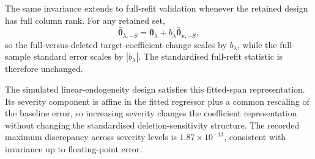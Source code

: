 \documentclass[../main.tex]{subfiles}
\begin{document}
The same invariance extends to full-refit validation whenever the retained design has full column rank. For any retained set,
\[
\widehat{\boldsymbol{\theta}}_{\lambda,-S}
=
\boldsymbol{\theta}_\lambda
+
b_\lambda\widehat{\boldsymbol{\theta}}_{\mathbf{v},-S},
\]
so the full-versus-deleted target-coefficient change scales by \(b_\lambda\), while the full-sample standard error scales by \(|b_\lambda|\). The standardised full-refit statistic is therefore unchanged.

The simulated linear-endogeneity design satisfies this fitted-span representation. Its severity component is affine in the fitted regressor plus a common rescaling of the baseline error, so increasing severity changes the coefficient representation without changing the standardised deletion-sensitivity structure. The recorded maximum discrepancy across severity levels is \(1.87\times10^{-13}\), consistent with invariance up to floating-point error.
\end{document}

